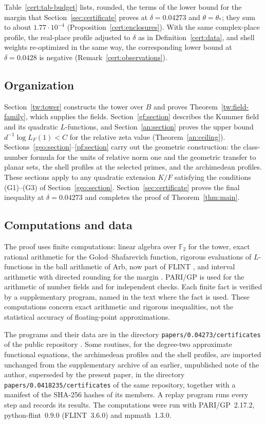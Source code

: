 \documentclass[11pt]{amsart}
\numberwithin{equation}{section}
\theoremstyle{definition}
\theoremstyle{remark}
\newcommand{\Ftwo}{\mathbb F_2}
\newcommand{\deltastar}{0.04273}
\begin{document}
Table~\ref{cert:tab-budget} lists, rounded, the terms of the lower bound
for the margin that Section~\ref{sec:certificate} proves at
$\delta=\deltastar$ and $\theta=\theta_*$; they sum to about $1.77\cdot10^{-4}$
(Proposition~\ref{cert:enclosures}). With the same complex-place
profile, the real-place profile adjusted to $\delta$ as in
Definition~\ref{cert:data}, and shell weights re-optimized in the same
way, the corresponding lower bound at $\delta=0.0428$ is negative
(Remark~\ref{cert:observations}).

\subsection{Organization}\label{intro:organization}
Section~\ref{tw:tower} constructs the tower over $B$ and proves
Theorem~\ref{tw:field-family}, which supplies the fields.
Section~\ref{gf:section} describes the Kummer field and its quadratic
$L$-functions, and Section~\ref{an:section} proves the upper bound
$d^{-1}\log L_F(1)<C$ for the relative zeta value
(Theorem~\ref{an:ceiling}). Sections~\ref{geo:section}--\ref{pf:section}
carry out the geometric construction: the class-number formula for the
units of relative norm one and the geometric transfer to planar sets,
the shell profiles at the selected primes, and the archimedean profiles.
These sections apply to any quadratic extension $K/F$ satisfying the
conditions (G1)--(G3) of Section~\ref{geo:section}. Section~\ref{sec:certificate} proves the final inequality
at $\delta=\deltastar$ and completes the proof of
Theorem~\ref{thm:main}.

\subsection{Computations and data}\label{intro:code}
The proof uses finite computations: linear algebra over $\Ftwo$ for the
tower, exact rational arithmetic for the Golod--Shafarevich function,
rigorous evaluations of $L$-functions in the ball arithmetic of Arb,
now part of FLINT \cite{Johansson2017,FLINT}, and interval arithmetic
with directed rounding for the margin \cite{Mpmath}. PARI/GP \cite{PARI} is
used for the arithmetic of number fields and for independent checks.
Each finite fact is verified by a supplementary program, named in the
text where the fact is used. These computations concern exact
arithmetic and rigorous inequalities, not the statistical accuracy of
floating-point approximations.

The programs and their data are in the directory
\texttt{papers/0.04273/certificates} of the public repository
\cite{NaslundCode2026}. Some routines, for the degree-two approximate
functional equations, the archimedean profiles and the shell profiles,
are imported unchanged from the supplementary archive of an earlier,
unpublished note of the author, superseded by the present paper, in the
directory
\texttt{papers/0.0418235/certificates} of the same repository, together
with a manifest of the SHA-256 hashes of its members. A replay program
runs every step and records its results. The computations were run with
PARI/GP~2.17.2, python-flint~0.9.0 (FLINT~3.6.0) and mpmath~1.3.0.
\end{document}

